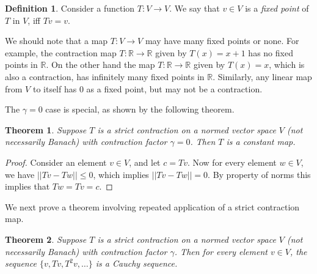 \documentclass{article}
\newtheorem{theorem}{Theorem}[section]
\theoremstyle{definition}
\newtheorem{definition}{Definition}[section]
\theoremstyle{remark}
\begin{document}
\begin{definition}
Consider a function $T:V \rightarrow V$. We say that $v \in V$ is a \textit{fixed point} of $T$ in $V$, iff $Tv = v$.
\label{def-fixed-point}
\end{definition}

We should note that a map $T:V \rightarrow V$ may have many fixed points or none. For example, the contraction map $T : \mathbb{R} \rightarrow \mathbb{R}$ given by $T(x) = x + 1$ has no fixed points in $\mathbb{R}$. On the other hand the map $T : \mathbb{R} \rightarrow \mathbb{R}$ given by $T(x) = x$, which is also a contraction, has infinitely many fixed points in $\mathbb{R}$. Similarly, any linear map from $V$ to itself has $0$ as a fixed point, but may not be a contraction.

The $\gamma = 0$ case is special, as shown by the following theorem.
\begin{theorem}
Suppose $T$ is a strict contraction on a normed vector space $V$ (not necessarily Banach) with contraction factor $\gamma = 0$. Then $T$ is a constant map.
\label{th-gamma-zero}
\end{theorem}

\begin{proof}
Consider an element $v \in V$, and let $c = Tv$. Now for every element $w \in V$, we have $||Tv - Tw|| \leq 0$, which implies $||Tv - Tw|| = 0$. By property of norms this implies that $Tw = Tv = c$.
\end{proof}

We next prove a theorem involving repeated application of a strict contraction map.
\begin{theorem}
Suppose $T$ is a strict contraction on a normed vector space $V$ (not necessarily Banach) with contraction factor $\gamma$. Then for every element $v \in V$, the sequence $\{v,Tv,T^{2}v,\dots\}$ is a Cauchy sequence.
\label{th-power-series}
\end{theorem}
\end{document}
